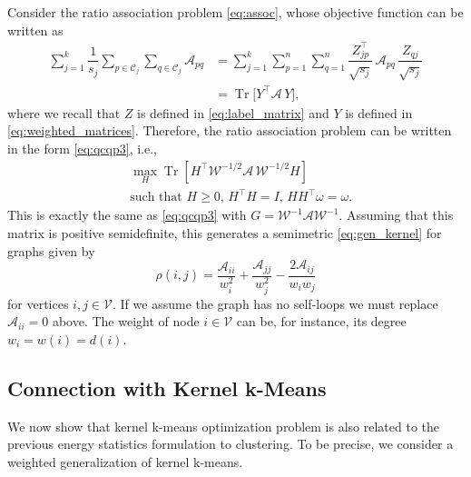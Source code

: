 \documentclass[10pt,journal,compsoc]{IEEEtran}
\DeclareMathOperator{\Tr}{Tr}
\newcommand\C{{\mathcal{C}}}
\newcommand\om{\omega}
\begin{document}
Consider the ratio association problem \eqref{eq:assoc}, 
whose objective function can be written as
\begin{equation}
\begin{split}
\sum_{j=1}^k \dfrac{1}{s_j} \sum_{p \in \C_j} \sum_{q \in \C_j}
\mathcal{A}_{pq} &= \sum_{j=1}^k \sum_{p=1}^n \sum_{q=1}^n 
\dfrac{Z^\top_{jp}}{\sqrt{s_j}} \, \mathcal{A}_{pq} \, 
\dfrac{Z_{qj}}{\sqrt{s_j}} \\
&= \Tr\big[ Y^\top \mathcal{A} \, Y \big] ,
\end{split}
\end{equation}
where we recall that $Z$ is defined in \eqref{eq:label_matrix} and $Y$ is
defined in
\eqref{eq:weighted_matrices}. Therefore, the ratio association problem
can be written in the form \eqref{eq:qcqp3}, i.e.,
\begin{equation}
\begin{split}
&\max_H \Tr \left[
H^\top \mathcal{W}^{-1/2} \mathcal{A} \, \mathcal{W}^{-1/2} H 
\right] \\ &\mbox{such that $H\ge 0$, $H^\top H = I$, $H H^\top
\om=\om$}.
\end{split}
\end{equation}
This is exactly the same as \eqref{eq:qcqp3}
with  $G = \mathcal{W}^{-1} \mathcal{A} \mathcal{W}^{-1}$. Assuming that this
matrix is positive semidefinite, this generates a semimetric
\eqref{eq:gen_kernel} for graphs given by
\begin{equation}
\label{eq:metric_graphs}
\rho(i,j) = 
\dfrac{\mathcal{A}_{ii}}{w_i^{2}}
+\dfrac{\mathcal{A}_{jj}}{w_j^{2}}
-\dfrac{2 \mathcal{A}_{ij}}{w_i w_j}
\end{equation}
for vertices $i,j \in \mathcal{V}$. If
we assume the graph has no self-loops we must replace
$\mathcal{A}_{ii} = 0$ above. 
The weight of node $i\in \mathcal{V}$ can be, for instance,
its degree $w_i = w(i) = d(i)$.


\subsection{Connection with Kernel k-Means}
\label{sec:kernel_kmeans}

We now show that kernel k-means optimization problem \cite{Dhillon2,Dhillon}
is also related 
to the previous energy statistics formulation to clustering. To be precise,
we consider a weighted generalization of kernel k-means.
\end{document}
